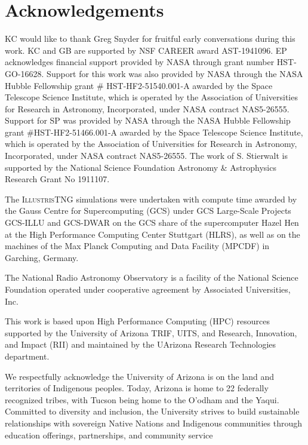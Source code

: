 \documentclass[twocolumn]{aastex631}
\begin{document}
\section*{Acknowledgements}
KC would like to thank Greg Snyder for fruitful early conversations during this work. 
KC and GB are supported by NSF CAREER award AST-1941096. 
EP acknowledges financial support provided by NASA through grant number HST-GO-16628. 
Support for this work was also provided by NASA through the NASA Hubble Fellowship grant \# HST-HF2-51540.001-A awarded by the Space Telescope Science Institute, which is operated by the Association of Universities for Research in Astronomy, Incorporated, under NASA contract NAS5-26555.
Support for SP was provided by NASA through the NASA Hubble Fellowship grant \#HST-HF2-51466.001-A awarded by the Space Telescope Science Institute, which is operated by the Association of Universities for Research in Astronomy, Incorporated, under NASA contract NAS5-26555.
The work of S. Stierwalt is supported by the National Science Foundation Astronomy \& Astrophysics Research Grant No 1911107.

The \textsc{IllustrisTNG} simulations were undertaken with compute time awarded by the Gauss Centre for Supercomputing (GCS) under GCS Large-Scale Projects GCS-ILLU and GCS-DWAR on the GCS share of the supercomputer Hazel Hen at the High Performance Computing Center Stuttgart (HLRS), as well as on the machines of the Max Planck Computing and Data Facility (MPCDF) in Garching, Germany.

The National Radio Astronomy Observatory is a facility of the National Science Foundation operated under cooperative agreement by Associated Universities, Inc.

This work is based upon High Performance Computing (HPC) resources supported by the University of Arizona TRIF, UITS, and Research, Innovation, and Impact (RII) and maintained by the UArizona Research Technologies department.

We respectfully acknowledge the University of Arizona is on the land and territories of Indigenous peoples. Today, Arizona is home to 22 federally recognized tribes, with Tucson being home to the O’odham and the Yaqui. Committed to diversity and inclusion, the University strives to build sustainable relationships with sovereign Native Nations and Indigenous communities through education offerings, partnerships, and community service


{}

\end{document}
